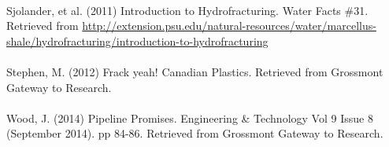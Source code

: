 \documentclass{article}
\begin{document}
  \paragraph{}  Sjolander, et al. (2011) Introduction to Hydrofracturing. Water Facts \#31. Retrieved from \url{http://extension.psu.edu/natural-resources/water/marcellus-shale/hydrofracturing/introduction-to-hydrofracturing}
  \paragraph{}  Stephen, M. (2012) Frack yeah! Canadian Plastics. Retrieved from Grossmont Gateway to Research.
  \paragraph{}  Wood, J. (2014) Pipeline Promises. Engineering \& Technology Vol 9 Issue 8 (September 2014). pp 84-86. Retrieved from Grossmont Gateway to Research.
\end{document}
